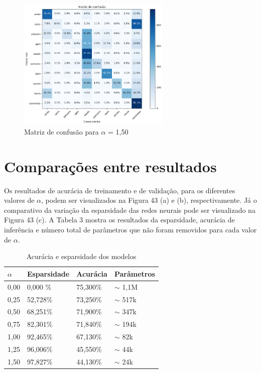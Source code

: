 \begin{figure}[H]
	\includegraphics[width=0.65\textwidth, keepaspectratio=true]{figuras/CAP4/cm_150_.png}
	\centering
	\caption[Matriz de confusão para $\alpha$ = 1,50]{Matriz de confusão para $\alpha$ = 1,50}
\end{figure}



\section{Comparações entre resultados}
Os resultados de acurácia de treinamento e de validação, para os diferentes valores de $\alpha$, podem ser visualizados na Figura 43 (a) e (b), respectivamente. Já o comparativo da variação da esparsidade das redes neurais pode ser visualizado na Figura 43 (c). A Tabela 3 mostra os resultados da esparsidade, acurácia de inferência e número total de parâmetros que não foram removidos para cada valor de $\alpha$. 

\begin{table}[H]
    \centering
    \begin{tabular}{ |p{3cm}|p{3cm}|p{3cm}|p{3cm}|  }
 \hline
 $\alpha$& Esparsidade &Acurácia &Parâmetros\\
 \hline
    0,00        &0,000 \%       &75,300\%    & $\sim$ 1,1M\\
    0,25        &52,728\%       &73,250\%    & $\sim$ 517k\\
    0,50        &68,251\%       &71,900\%    & $\sim$ 347k\\
    0,75        &82,301\%       &71,840\%    & $\sim$ 194k\\
    1,00        &92,465\%       &67,130\%    & $\sim$ 82k\\
    1,25        &96,006\%       &45,550\%    & $\sim$ 44k\\
    1,50        &97,827\%       &44,130\%    & $\sim$ 24k\\
 \hline
\end{tabular}
    \caption{Acurácia e esparsidade dos modelos}
    \label{tab:my_label}
\end{table}

